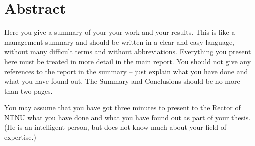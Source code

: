 \newpage
{}
\section*{Abstract}
\label{sec:abstract}
\begin{info}
	Here you give a summary of your your work and your results. This is like a management summary and should be written in a clear and easy language, without many difficult terms and without abbreviations. Everything you present here must be treated in more detail in the main report. You should not give any references to the report in the summary -- just explain what you have done and what you have found out. The Summary and Conclusions should be no more than two pages.

	You may assume that you have got three minutes to present to the Rector of NTNU  what you have done and what you have found out as part of your thesis. (He is an intelligent person, but does not know much about your field of expertise.)
\end{info}



